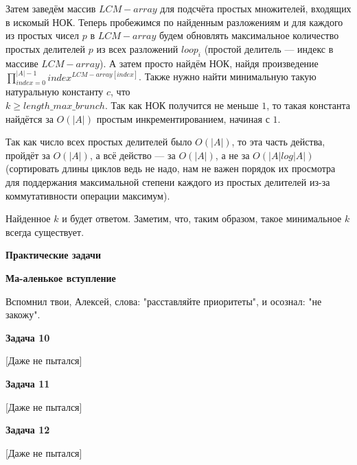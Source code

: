 \documentclass[12pt]{article}
\begin{document}
	Затем заведём массив $ LCM-array $ для подсчёта простых множителей, входящих в искомый НОК. Теперь пробежимся по найденным разложениям и для каждого из простых чисел $ p $ в $ LCM-array $ будем обновлять максимальное количество простых делителей $ p $ из всех разложений $ loop_i $ (простой делитель --- индекс в массиве $ LCM-array $). А затем просто найдём НОК, найдя произведение $ \prod\limits_{index = 0}^{|A| - 1} index^{LCM-array[index]}$. Также нужно найти минимальную такую натуральную константу $ c $, что \\
	$ k \ge length\_max\_brunch$. Так как НОК получится не меньше $ 1 $, то такая константа найдётся за $ O(|A|) $ простым инкрементированием, начиная с $ 1 $.
	
	Так как число всех простых делителей было $O(|A|)$, то эта часть действа, пройдёт за $ O(|A|) $, а всё действо --- за $ O(|A|) $, а не за $ O(|A| log |A|) $ (сортировать длины циклов ведь не надо, нам не важен порядок их просмотра для поддержания максимальной степени каждого из простых делителей из-за коммутативности операции максимум).
	
	Найденное $ k $ и будет ответом. Заметим, что, таким образом, такое минимальное $ k $ всегда существует.
	\newline
	
	\textbf{\Large Практические задачи}
	\newline
	
	\textbf{\large Ма-аленькое вступление}
	
	Вспомнил твои, Алексей, слова: "расставляйте приоритеты", и осознал: "не закожу".
	\newline
	
	\textbf{\large Задача 10}
	
	[Даже не пытался]
	\newline
	
	\textbf{\large Задача 11}
	
	[Даже не пытался]
	\newline
	
	\textbf{\large Задача 12}
	
	[Даже не пытался]
\end{document}
